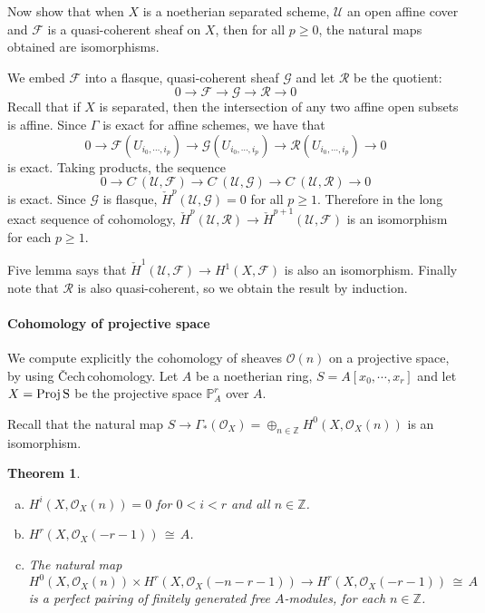 \documentclass[12pt]{article}
\theoremstyle{plain}
\newtheorem{theorem}[equation]{Theorem}
\theoremstyle{definition}
\newcommand{\sU}{\mathcal{U}}
\newcommand{\IP}{\mathbb{P}}
\newcommand{\IZ}{\mathbb{Z}}
\newcommand{\sO}{\mathcal{O}}
\newcommand{\shF}{\mathscr{F}}
\newcommand{\shG}{\mathscr{G}}
\newcommand{\shR}{\mathscr{R}}
\newcommand{\Proj}{\rm Proj \,}
\newcommand{\id}{\rm id}
\newcommand\iso{{\, \cong \,}}
\newcommand{\<}{\langle}
\renewcommand{\>}{\rangle}
\newcommand{\Cech}{\v{C}ech\,}
\newcommand{\cH}{\check{H}}
\begin{document}
Now show that when $X$ is a noetherian separated scheme, $\sU$ an open affine cover and $\shF$ is a quasi-coherent sheaf on $X$, then for all $p \ge 0$, the natural maps obtained are isomorphisms. 

We embed $\shF$ into a flasque, quasi-coherent sheaf $\shG$ and let $\shR$ be the quotient: 
$$ 0 \to \shF \to \shG \to \shR \to 0 $$
Recall that if $X$ is separated, then the intersection of any two affine open subsets is affine. Since $\Gamma$ is exact for affine schemes, we have that 
$$ 0 \to \shF(U_{i_0, \cdots, i_p}) \to \shG(U_{i_0, \cdots, i_p}) \to \shR(U_{i_0, \cdots, i_p}) \to 0 $$
is exact. Taking products, the sequence
$$ 0 \to C^\cdot (\sU, \shF) \to C^\cdot (\sU, \shG) \to C^\cdot (\sU, \shR) \to 0 $$
is exact. Since $\shG$ is flasque, $\cH^p(\sU, \shG) = 0$ for all $p \ge 1$. Therefore in the long exact sequence of cohomology, $\cH^p(\sU, \shR) \to \cH^{p + 1}(\sU, \shF)$ is an isomorphism for each $p \ge 1$. 

\begin{center}
\end{center}

Five lemma says that $\cH^1(\sU, \shF) \to H^1(X, \shF)$ is also an isomorphism. Finally note that $\shR$ is also quasi-coherent, so we obtain the result by induction. 


\paragraph{Cohomology of projective space}
We compute explicitly the cohomology of sheaves $\sO(n)$ on a projective space, by using \Cech cohomology. Let $A$ be a noetherian ring, $S = A[x_0, \cdots, x_r]$ and let $X = \Proj S$ be the projective space $\IP_A^r$ over $A$. 

Recall that the natural map $S \to \Gamma_*(\sO_X) = \oplus_{n \in \IZ} H^0(X, \sO_X(n))$ is an isomorphism. 

\begin{theorem}
\begin{enumerate}[a.]
\item $H^i(X, \sO_X(n)) = 0$ for $0 < i < r$ and all $n \in \IZ$. 
\item $H^r(X, \sO_X(-r - 1)) \iso A$. 
\item The natural map $H^0(X, \sO_X(n)) \times H^r(X, \sO_X(-n - r - 1)) \to H^r(X, \sO_X(-r - 1)) \iso A$ is a perfect pairing of finitely generated free $A$-modules, for each $n \in \IZ$. 
\end{enumerate}
\end{theorem}
\end{document}
